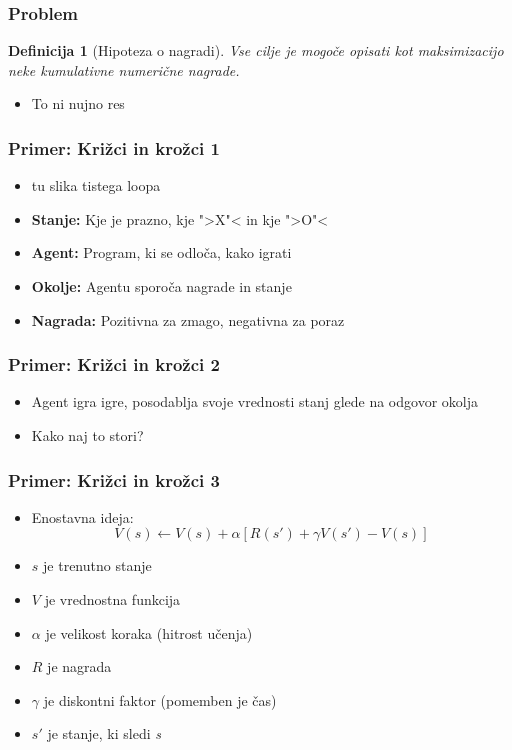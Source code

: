 \documentclass{beamer}    %
\newtheorem{definicija}[izrek]{Definicija}
\begin{document}
\begin{frame}
    \frametitle{Problem}
    \begin{definicija}[Hipoteza o nagradi]
        Vse cilje je mogoče opisati kot maksimizacijo neke kumulativne numerične 
        nagrade.
    \end{definicija}

    \medskip

    \begin{itemize}
        \item To ni nujno res
    \end{itemize}
\end{frame}


\begin{frame}
    \frametitle{Primer: Križci in krožci 1}
    \begin{itemize}
        \item tu slika tistega loopa %
        \item \textbf{Stanje:} Kje je prazno, kje ">X"< in kje ">O"<
        \item \textbf{Agent:} Program, ki se odloča, kako igrati
        \item \textbf{Okolje:} Agentu sporoča nagrade in stanje
        \item \textbf{Nagrada:} Pozitivna za zmago, negativna za poraz
    \end{itemize}
\end{frame}


\begin{frame}
    \frametitle{Primer: Križci in krožci 2}
    \begin{itemize}
        \item Agent igra igre, posodablja svoje vrednosti stanj glede na odgovor okolja
        \item Kako naj to stori?
    \end{itemize}
\end{frame}


\begin{frame}
    \frametitle{Primer: Križci in krožci 3}
    \begin{itemize}
        \item Enostavna ideja:                                  
        \pause
        $$
        V(s) \leftarrow V(s) + \alpha [R(s') + \gamma V(s') - V(s)]
        $$
        \pause
        \item $s$ je trenutno stanje                     
        \pause
        \item $V$ je vrednostna funkcija                 
        \pause
        \item $\alpha$ je velikost koraka (hitrost učenja) 
        \pause
        \item $R$ je nagrada   
        \pause
        \item $\gamma$ je diskontni faktor (pomemben je čas)    
        \pause
        \item $s'$ je stanje, ki sledi \textit{s}        
    \end{itemize}
\end{frame}
\end{document}
